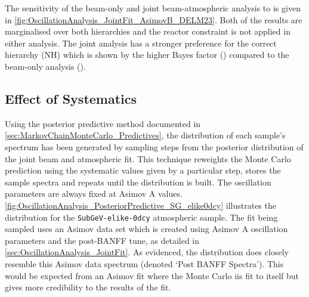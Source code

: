 The sensitivity of the beam-only and joint beam-atmospheric analysis to  is given in \autoref{fig:OscillationAnalysis_JointFit_AsimovB_DELM23}. Both of the results are marginalised over both hierarchies and the reactor constraint is not applied in either analysis. The joint analysis has a stronger preference for the correct hierarchy (NH) which is shown by the higher Bayes factor () compared to the beam-only analysis (). 

\subsection{Effect of Systematics}
\label{sec:EffectOfSystematics}

Using the posterior predictive method documented in \autoref{sec:MarkovChainMonteCarlo_Predictives}, the distribution of each sample's spectrum has been generated by sampling  steps from the posterior distribution of the joint beam and atmospheric fit. This technique reweights the Monte Carlo prediction using the systematic values given by a particular step, stores the sample spectra and repeats until the distribution is built. The oscillation parameters are always fixed at Asimov A values. \autoref{fig:OscillationAnalysis_PosteriorPredictive_SG_elike0dcy} illustrates the distribution for the \texttt{SubGeV-elike-0dcy} atmospheric sample. The fit being sampled uses an Asimov data set which is created using Asimov A oscillation parameters and the post-BANFF tune, as detailed in \autoref{sec:OscillationAnalysis_JointFit}. As evidenced, the distribution does closely resemble this Asimov data spectrum (denoted `Post BANFF Spectra'). This would be expected from an Asimov fit where the Monte Carlo iis fit to itself but gives more credibility to the results of the fit.

